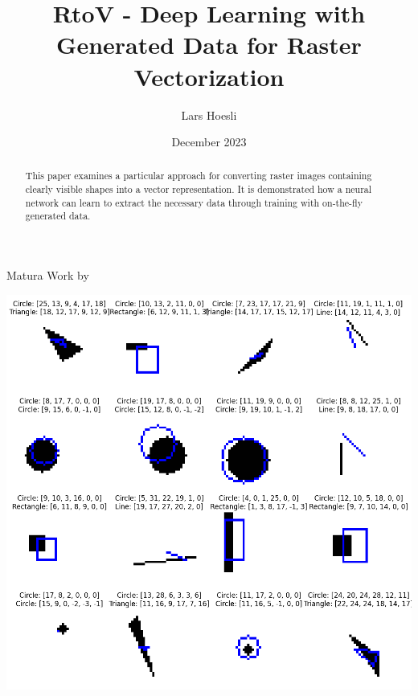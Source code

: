 \documentclass[12pt, a4paper, titlepage]{report}
\title{RtoV - Deep Learning with Generated Data for Raster Vectorization}
\author{Lars Hoesli}
\date{December 2023}
\begin{document}

\begin{titlepage}
    \centering

    \Huge{\textbf{\inserttitle}}
    \par
    \Large{Matura Work by \insertauthor}
    \vspace{1cm}\par
    \large{\insertdate}
    \vspace{2cm}

    \includegraphics[width=1.0\textwidth]{../rc/images/all_shapes_approx_visual1.png}
    \vfill
    \begin{abstract}
		 This paper examines a particular approach for converting raster images containing clearly visible shapes into a vector representation.
		 It is demonstrated how a neural network can learn to extract the necessary data through training with on-the-fly generated data.
    \end{abstract}


\end{titlepage}
\end{document}
